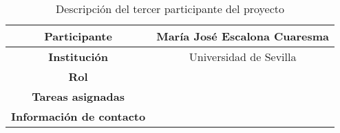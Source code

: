 \begin{table}[H]
    \centering
    \begin{tabular}{|c|c|}
    \hline
    \textbf{Participante} & María José Escalona Cuaresma \\
    \hline
    \textbf{Institución} & Universidad de Sevilla \\
    \hline
    \textbf{Rol} &  \\
    \hline
    \textbf{Tareas asignadas} & \\
    \hline
    \textbf{Información de contacto} & \\
    \hline
    \end{tabular}
\caption{Descripción del tercer participante del proyecto}
\label{tab:tercerParticipante}
\end{table}